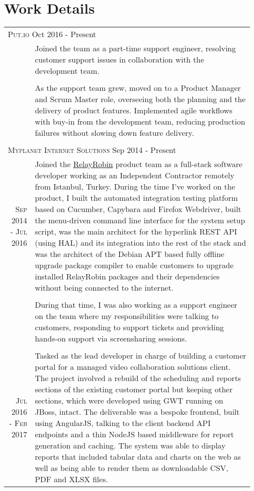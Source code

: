\documentclass[a4paper,10pt]{article}
\newcommand{\exptitle}[2]{
  \multicolumn{2}{l}{\textsc{#1} \footnotesize{#2}} \\
  \specialrule{.01em}{0.5em}{1em}
}
\begin{document}
\section{Work Details}
\begin{longtable}{r|p{11cm}}
  \exptitle{Put.io}{Oct 2016 - Present}

                                &  Joined the team as a part-time support engineer, resolving customer support issues in collaboration with the development team. \\
                                & \\
                                & As the support team grew, moved on to a Product Manager and Scrum Master role, overseeing both the planning and the delivery of product features. Implemented agile workflows with buy-in from the development team, reducing production failures without slowing down feature delivery. \\

  \multicolumn{2}{c}{} \\

  \exptitle{Myplanet Internet Solutions}{Sep 2014 - Present}

  \textsc{Sep 2014 - Jul 2016}   & Joined the \href{http://relayrobin.com}{RelayRobin} product team as a full-stack software developer working as an Independent Contractor remotely from Istanbul, Turkey. During the time I've worked on the product, I built the automated integration testing platform based on Cucumber, Capybara and Firefox Webdriver, built the menu-driven command line interface for the system setup script, was the main architect for the hyperlink REST API (using HAL) and its integration into the rest of the stack and was the architect of the Debian APT based fully offline upgrade package compiler to enable customers to upgrade installed RelayRobin packages and their dependencies without being connected to the internet. \\
                                & \\
                                & During that time, I was also working as a support engineer on the team where my responsibilities were talking to customers, responding to support tickets and providing hands-on support via screensharing sessions. \\
  \multicolumn{2}{c}{} \\
  \textsc{Jul 2016 - Feb 2017}  & Tasked as the lead developer in charge of building a customer portal for a managed video collaboration solutions client. The project involved a rebuild of the scheduling and reports sections of the existing customer portal but keeping other sections, which were developed using GWT running on JBoss, intact. The deliverable was a bespoke frontend, built using AngularJS, talking to the client backend API endpoints and a thin NodeJS based middleware for report generation and caching. The system was able to display reports that included tabular data and charts on the web as well as being able to render them as downloadable CSV, PDF and XLSX files.  \\


\end{longtable}
\end{document}
